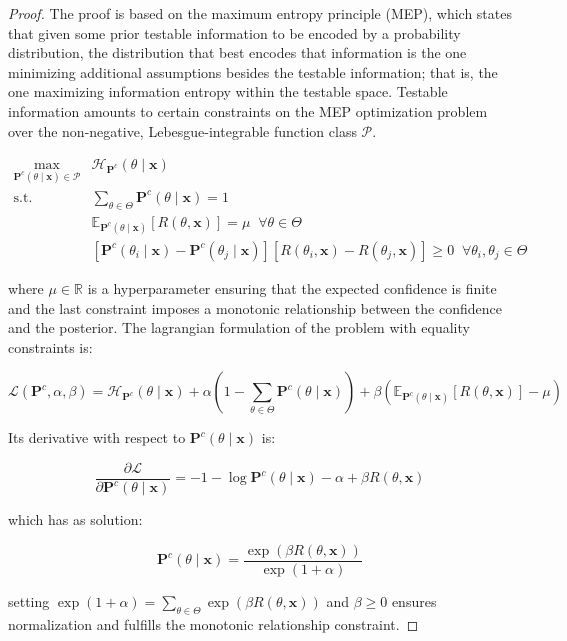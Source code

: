 \begin{proof}
    The proof is based on the maximum entropy principle (MEP), which states that
    given some prior testable information to be encoded by a probability 
    distribution, the distribution that best encodes that information is the one
    minimizing additional assumptions besides the testable information; that is, the one
    maximizing information entropy within the testable space. Testable information amounts to certain constraints on
    the MEP optimization problem over the non-negative, Lebesgue-integrable function class $\mathcal{P}$.

    $$
    \begin{aligned}
        \underset{\mathbf{P}^c(\theta \mid \bm{x}) \in \mathcal{P}}{\operatorname{max}} & \mathcal{H}_{\mathbf{P}^c}(\theta \mid \bm{x}) \\
        \text {s.t.} & \sum_{\theta \in \Theta} \mathbf{P}^c(\theta \mid \bm{x}) = 1 \\
        & \mathbb{E}_{\mathbf{P}^c(\theta \mid \bm{x})}[R(\theta, \bm{x})]=\mu \;\; \forall \theta \in \Theta \\
        & [\mathbf{P}^c(\theta_i \mid \bm{x}) - \mathbf{P}^c(\theta_j \mid \bm{x})][R(\theta_i, \bm{x}) - R(\theta_j, \bm{x})] \geq 0 \;\; \forall \theta_i, \theta_j \in \Theta
    \end{aligned}
    $$

    where $\mu \in \mathbb{R}$ is a hyperparameter ensuring that the expected confidence is finite
    and the last constraint imposes a monotonic relationship between the confidence and the posterior.
    The lagrangian formulation of the problem with equality constraints is:

    $$
        \mathcal{L}(\mathbf{P}^c, \alpha, \beta) = \mathcal{H}_{\mathbf{P}^c}(\theta \mid \bm{x}) + \alpha \left ( 1 - \sum_{\theta \in \Theta} \mathbf{P}^c(\theta \mid \bm{x}) \right ) +
        \beta  \left ( \mathbb{E}_{\mathbf{P}^c(\theta \mid \bm{x})}[R(\theta, \bm{x})] - \mu \right )
    $$

    Its derivative with respect to $\mathbf{P}^c(\theta \mid \bm{x})$ is:

    $$
    \frac{\partial \mathcal{L}}{\partial \mathbf{P}^c(\theta \mid \bm{x})} = -1 - \log \mathbf{P}^c(\theta \mid \bm{x}) - \alpha + \beta R(\theta, \bm{x})
    $$

    which has as solution:

    $$
    \mathbf{P}^c(\theta \mid \bm{x}) = \frac{\exp \left ( \beta R(\theta, \bm{x}) \right )}{\exp \left ( 1+ \alpha \right )}
    $$

    setting $\exp \left ( 1+ \alpha \right ) = \sum_{\theta \in \Theta} \exp \left ( \beta R(\theta, \bm{x}) \right )$ and $\beta \geq 0$ 
    ensures normalization and fulfills the monotonic relationship constraint.
\end{proof}

